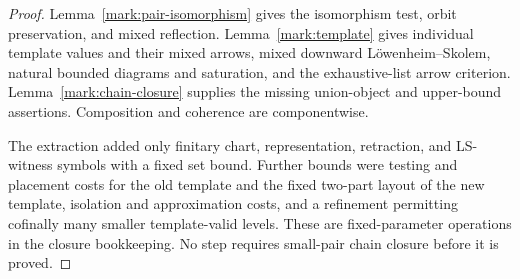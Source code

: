 \begin{proof}
Lemma~\ref{mark:pair-isomorphism}
gives the isomorphism test, orbit
preservation, and mixed reflection.
Lemma~\ref{mark:template} gives
individual template values and their
mixed arrows, mixed downward
Löwenheim--Skolem, natural bounded
diagrams and saturation, and the
exhaustive-list arrow criterion.
Lemma~\ref{mark:chain-closure}
supplies the missing union-object
and upper-bound assertions.
Composition and coherence are
componentwise.

The extraction added only finitary
chart, representation, retraction,
and LS-witness symbols with a
fixed set bound.  Further bounds
were testing and placement costs
for the old template and the
fixed two-part layout of the
new template, isolation and
approximation costs, and a
refinement permitting cofinally
many smaller template-valid levels.
These are fixed-parameter
operations in the closure
bookkeeping.  No step requires
small-pair chain closure before
it is proved.
\end{proof}
